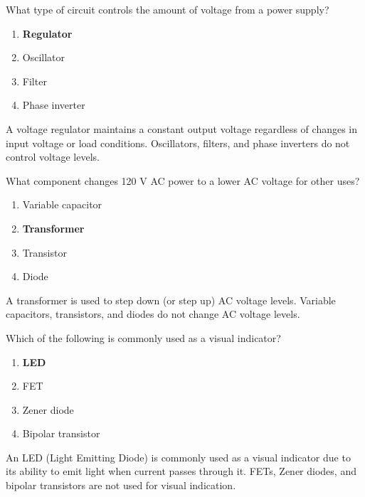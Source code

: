 
\begin{tcolorbox}[colback=gray!10!white,colframe=black!75!black,title={T6D05}]
    What type of circuit controls the amount of voltage from a power supply?
    \begin{enumerate}[label=\Alph*),noitemsep]
        \item \textbf{Regulator}
        \item Oscillator
        \item Filter
        \item Phase inverter
    \end{enumerate}
\end{tcolorbox}
A voltage regulator maintains a constant output voltage regardless of changes in input voltage or load conditions. Oscillators, filters, and phase inverters do not control voltage levels.


\begin{tcolorbox}[colback=gray!10!white,colframe=black!75!black,title={T6D06}]
    What component changes 120 V AC power to a lower AC voltage for other uses?
    \begin{enumerate}[label=\Alph*),noitemsep]
        \item Variable capacitor
        \item \textbf{Transformer}
        \item Transistor
        \item Diode
    \end{enumerate}
\end{tcolorbox}
A transformer is used to step down (or step up) AC voltage levels. Variable capacitors, transistors, and diodes do not change AC voltage levels.


\begin{tcolorbox}[colback=gray!10!white,colframe=black!75!black,title={T6D07}]
    Which of the following is commonly used as a visual indicator?
    \begin{enumerate}[label=\Alph*),noitemsep]
        \item \textbf{LED}
        \item FET
        \item Zener diode
        \item Bipolar transistor
    \end{enumerate}
\end{tcolorbox}
An LED (Light Emitting Diode) is commonly used as a visual indicator due to its ability to emit light when current passes through it. FETs, Zener diodes, and bipolar transistors are not used for visual indication.

